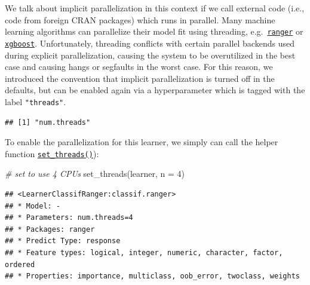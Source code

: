 \documentclass[
]{scrbook}
\newenvironment{Shaded}{\begin{snugshade}}{\end{snugshade}}
\newcommand{\AttributeTok}[1]{\textcolor[rgb]{0.77,0.63,0.00}{#1}}
\newcommand{\CommentTok}[1]{\textcolor[rgb]{0.56,0.35,0.01}{\textit{#1}}}
\newcommand{\DecValTok}[1]{\textcolor[rgb]{0.00,0.00,0.81}{#1}}
\newcommand{\FunctionTok}[1]{\textcolor[rgb]{0.00,0.00,0.00}{#1}}
\newcommand{\NormalTok}[1]{#1}
\newcommand{\OtherTok}[1]{\textcolor[rgb]{0.56,0.35,0.01}{#1}}
\newcommand{\SpecialCharTok}[1]{\textcolor[rgb]{0.00,0.00,0.00}{#1}}
\newcommand{\StringTok}[1]{\textcolor[rgb]{0.31,0.60,0.02}{#1}}
\renewenvironment{Shaded} {\begin{snugshade}\small} {\end{snugshade}}
\begin{document}
We talk about implicit parallelization in this context if we call external code (i.e., code from foreign CRAN packages) which runs in parallel.
Many machine learning algorithms can parallelize their model fit using threading, e.g.~\href{https://mlr3learners.mlr-org.com/reference/mlr_learners_classif.ranger.html}{\texttt{ranger}}
or \href{https://mlr3learners.mlr-org.com/reference/mlr_learners_classif.xgboost.html}{\texttt{xgboost}}.
Unfortunately, threading conflicts with certain parallel backends used during explicit parallelization, causing the system to be overutilized in the best case and causing hangs or segfaults in the worst case.
For this reason, we introduced the convention that implicit parallelization is turned off in the defaults, but can be enabled again via a hyperparameter which is tagged with the label \texttt{"threads"}.

\begin{Shaded}
\end{Shaded}

\begin{verbatim}
## [1] "num.threads"
\end{verbatim}

To enable the parallelization for this learner, we simply can call the helper function \href{https://mlr3.mlr-org.com/reference/set_threads.html}{\texttt{set\_threads()}}):

\begin{Shaded}
\begin{Highlighting}[]
\CommentTok{\# set to use 4 CPUs}
\FunctionTok{set\_threads}\NormalTok{(learner, }\AttributeTok{n =} \DecValTok{4}\NormalTok{)}
\end{Highlighting}
\end{Shaded}

\begin{verbatim}
## <LearnerClassifRanger:classif.ranger>
## * Model: -
## * Parameters: num.threads=4
## * Packages: ranger
## * Predict Type: response
## * Feature types: logical, integer, numeric, character, factor, ordered
## * Properties: importance, multiclass, oob_error, twoclass, weights
\end{verbatim}
\end{document}
